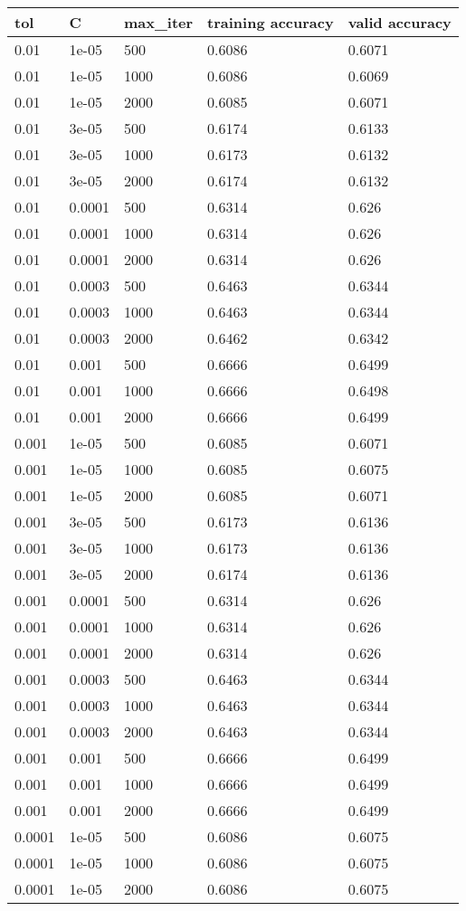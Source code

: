 \documentclass{article}%
\begin{document}
%
\normalsize%
\begin{longtable}{l l l l l}%
\hline%
tol&C&max\_iter&training accuracy&valid accuracy\\%
\hline%
\endhead%
\hline%
0.01&1e{-}05&500&0.6086&0.6071\\%
0.01&1e{-}05&1000&0.6086&0.6069\\%
0.01&1e{-}05&2000&0.6085&0.6071\\%
0.01&3e{-}05&500&0.6174&0.6133\\%
0.01&3e{-}05&1000&0.6173&0.6132\\%
0.01&3e{-}05&2000&0.6174&0.6132\\%
0.01&0.0001&500&0.6314&0.626\\%
0.01&0.0001&1000&0.6314&0.626\\%
0.01&0.0001&2000&0.6314&0.626\\%
0.01&0.0003&500&0.6463&0.6344\\%
0.01&0.0003&1000&0.6463&0.6344\\%
0.01&0.0003&2000&0.6462&0.6342\\%
0.01&0.001&500&0.6666&0.6499\\%
0.01&0.001&1000&0.6666&0.6498\\%
0.01&0.001&2000&0.6666&0.6499\\%
0.001&1e{-}05&500&0.6085&0.6071\\%
0.001&1e{-}05&1000&0.6085&0.6075\\%
0.001&1e{-}05&2000&0.6085&0.6071\\%
0.001&3e{-}05&500&0.6173&0.6136\\%
0.001&3e{-}05&1000&0.6173&0.6136\\%
0.001&3e{-}05&2000&0.6174&0.6136\\%
0.001&0.0001&500&0.6314&0.626\\%
0.001&0.0001&1000&0.6314&0.626\\%
0.001&0.0001&2000&0.6314&0.626\\%
0.001&0.0003&500&0.6463&0.6344\\%
0.001&0.0003&1000&0.6463&0.6344\\%
0.001&0.0003&2000&0.6463&0.6344\\%
0.001&0.001&500&0.6666&0.6499\\%
0.001&0.001&1000&0.6666&0.6499\\%
0.001&0.001&2000&0.6666&0.6499\\%
0.0001&1e{-}05&500&0.6086&0.6075\\%
0.0001&1e{-}05&1000&0.6086&0.6075\\%
0.0001&1e{-}05&2000&0.6086&0.6075\\%

\end{longtable}
\end{document}
